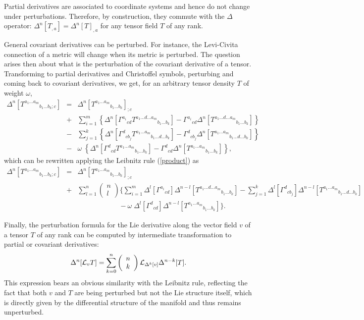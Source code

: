 \documentclass[aps,prd,showpacs]{revtex4}
\newcommand{\binomial}[2]{
    \left( \begin{array}{c} {#1} \\ {#2} \end{array} \right)
}
\begin{document}
Partial derivatives are associated to coordinate systems and hence do not
change under perturbations. Therefore, by construction, they commute with
the $\Delta$ operator: $\Delta^n[T_{,a}]=\Delta^n[T]_{,a}$ for any
tensor field $T$ of any rank.

General covariant derivatives can be perturbed. For instance, the
Levi-Civita connection of a metric will change when its metric is
perturbed. The question arises then about what is the perturbation of
the covariant derivative of a tensor. Transforming to partial derivatives
and Christoffel symbols, perturbing and coming back to covariant
derivatives, we get, for an arbitrary tensor density $T$ of weight $\omega$,
\begin{eqnarray}\label{pertCD}
\Delta^n[T^{a_1\dots a_m}{}_{b_1\dots b_k;c}]&=&\Delta^n[T^{a_1\dots a_m}{}_{b_1\dots b_k}]_{;c} \\ \nonumber
&+&\sum_{i=1}^m \left\{\Delta^n[\Gamma^{a_i}{}_{cd} T^{a_1\dots d\dots a_m}{}_{b_1\dots b_k}]
-\Gamma^{a_i}{}_{cd} \Delta^n[T^{a_1\dots d\dots a_m}{}_{b_1\dots b_k}]\right\}
\\\nonumber
&-&\sum_{j=1}^k\left\{ \Delta^n[\Gamma^{d}{}_{cb_j} T^{a_1\dots a_m}{}_{b_1\dots d\dots b_k}]
-\Gamma^{d}{}_{cb_j} \Delta^n[T^{a_1\dots a_m}{}_{b_1\dots d\dots b_k}]\right\}
\\\nonumber
&-&\omega\;\left\{ \Delta^n[\Gamma^{d}{}_{cd} T^{a_1\dots a_m}{}_{b_1\dots b_k}]
-\Gamma^{d}{}_{cd} \Delta^n[T^{a_1\dots a_m}{}_{b_1\dots b_k}]\right\},
\end{eqnarray}
which can be rewritten applying the Leibnitz rule (\ref{product}) as
\begin{eqnarray}\label{covd}
\Delta^n[T^{a_1\dots a_m}{}_{b_1\dots b_k;c}]&=&
\Delta^n[T^{a_1\dots a_m}{}_{b_1\dots b_k}]_{;c} \\
&+&\sum_{l=1}^n \binomial{n}{l}
\Big\{ 
\sum_{i=1}^m \Delta^l[\Gamma^{a_i}{}_{cd}]\Delta^{n-l}[T^{a_1\dots d\dots a_m}{}_{b_1\dots b_k}]
- \sum_{j=1}^k \Delta^l[\Gamma^{d}{}_{cb_j}]\Delta^{n-l}[ T^{a_1\dots a_m}{}_{b_1\dots d\dots b_k}]
\nonumber \\ \nonumber
&& \qquad\qquad\qquad - \omega\; \Delta^l[\Gamma^{d}{}_{cd}]\Delta^{n-l}[ T^{a_1\dots a_m}{}_{b_1\dots b_k}]
\Big\}.
\end{eqnarray}

Finally, the perturbation formula for the Lie derivative along the vector
field $v$ of a tensor $T$ of any rank can be computed by intermediate
transformation to partial or covariant derivatives:
\begin{equation}\label{pertLieD}
\Delta^n[{\cal L}_{v}T] =
\sum_{k=0}^{n} \binomial{n}{k}
{\cal L}_{\Delta^k[v]}\Delta^{n-k}[T].
\end{equation}
This expression bears an obvious similarity with the Leibnitz rule,
reflecting the fact that both $v$ and $T$ are being perturbed but not
the Lie structure itself, which is directly given by the differential
structure of the manifold and thus remains unperturbed.
\end{document}
